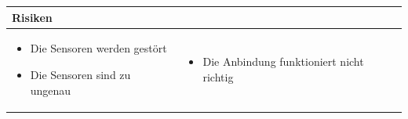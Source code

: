 \begin{table}[h]
\begin{tabular}{p{}p{}}


 \textbf{Risiken} & \\ \hline
	 
\begin{itemize}
\item Die Sensoren werden gestört
\item Die Sensoren sind zu ungenau
\end{itemize}
&
\begin{itemize}
\item Die Anbindung funktioniert nicht richtig
\end{itemize}

 
\end{tabular}
\end{table}

\pagebreak